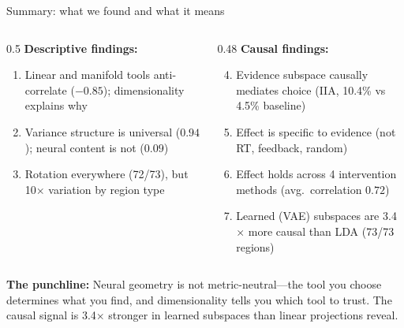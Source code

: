 \documentclass[aspectratio=169,11pt]{beamer}
\begin{document}
\begin{frame}{Summary: what we found and what it means}
\begin{columns}[T]
\begin{column}{0.5\textwidth}
\textbf{Descriptive findings:}
\begin{enumerate}
  \item Linear and manifold tools anti-correlate ($-0.85$); dimensionality explains why
  \item Variance structure is universal ($0.94$); neural content is not ($0.09$)
  \item Rotation everywhere (72/73), but 10$\times$ variation by region type
\end{enumerate}
\end{column}
\begin{column}{0.48\textwidth}
\textbf{Causal findings:}
\begin{enumerate}
  \setcounter{enumi}{3}
  \item Evidence subspace causally mediates choice (IIA, 10.4\% vs 4.5\% baseline)
  \item Effect is specific to evidence (not RT, feedback, random)
  \item Effect holds across 4 intervention methods (avg.\ correlation $0.72$)
  \item Learned (VAE) subspaces are 3.4$\times$ more causal than LDA (73/73 regions)
\end{enumerate}
\end{column}
\end{columns}

\vspace{0.5em}
{\small \textbf{The punchline:} Neural geometry is not metric-neutral---the tool you choose determines what you find, and dimensionality tells you which tool to trust. The causal signal is 3.4$\times$ stronger in learned subspaces than linear projections reveal.}
\end{frame}
\end{document}
